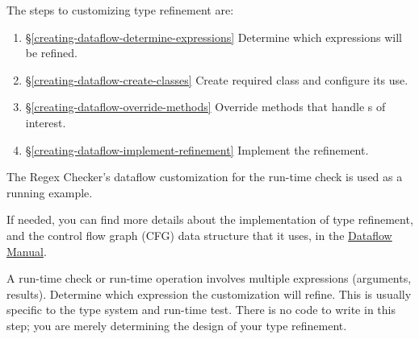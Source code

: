 The steps to customizing type refinement are:
\begin{enumerate}
\item{\S\ref{creating-dataflow-determine-expressions}}
  Determine which expressions will be refined.
\item{\S\ref{creating-dataflow-create-classes}}
  Create required class and configure its use.
\item{\S\ref{creating-dataflow-override-methods}}
  Override methods that handle s of interest.
\item{\S\ref{creating-dataflow-implement-refinement}}
  Implement the refinement.
\end{enumerate}

The Regex Checker's dataflow customization for the
run-time check is used as a running example.

If needed, you can find more details about the implementation of
type refinement, and the control flow graph (CFG) data
structure that it uses, in the
\href{https://checkerframework.org/manual/checker-framework-dataflow-manual.pdf}{Dataflow
  Manual}.



A run-time check or run-time
operation involves multiple expressions (arguments, results).
Determine which expression the customization will refine.  This is
usually specific to the type system and run-time test.
There is no code to write in this step; you are merely determining
the design of your type refinement.

